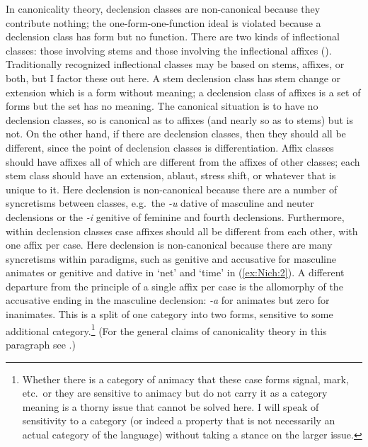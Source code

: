 \documentclass[output=collectionpaper]{langsci/langscibook}
\begin{document}
In canonicality theory, declension classes are non-canonical because they contribute nothing; the one-form-one-function ideal is violated because a declension class has form but no function. There are two kinds of inflectional classes: those involving stems and those involving the inflectional affixes (\citealt[184]{Bickel2007}). Traditionally recognized inflectional classes may be based on stems, affixes, or both, but I factor these out here.  A stem declension class has stem change or extension which is a form without meaning; a declension class of affixes is a set of forms but the set has no meaning. The canonical situation is to have no declension classes, so  is canonical as to affixes (and nearly so as to stems) but  is not. On the other hand, if there are declension classes, then they should all be different, since the point of declension classes is differentiation. Affix classes should have affixes all of which are different from the affixes of other classes; each stem class should have an extension, ablaut, stress shift, or whatever that is unique to it. Here  declension is non-canonical because there are a number of syncretisms between classes, e.g.\ the \textit{-u} dative of masculine and neuter declensions or the \textit{-i} genitive of feminine and fourth declensions. Furthermore, within declension classes case affixes should all be different from each other, with one affix per case. Here  declension is non-canonical because there are many syncretisms within paradigms, such as genitive and accusative for masculine animates or genitive and dative in `net' and `time' in (\ref{ex:Nich:2}). A different departure from the principle of a single affix per case is the allomorphy of the accusative ending in the masculine declension: \textit{-a} for animates but zero for inanimates. This is a split of one category into two forms, sensitive to some additional category.\footnote{%
Whether there is a category of animacy that these case forms signal, mark, etc.\ or they are sensitive to animacy but do not carry it as a category meaning is a thorny issue that cannot be solved here. I will speak of sensitivity to a category (or indeed a property that is not necessarily an actual category of the language) without taking a stance on the larger issue.
} %
(For the general claims of canonicality theory in this paragraph see \citealt{Corbett2007,Corbett2013c,Corbett2015}.)
\end{document}
